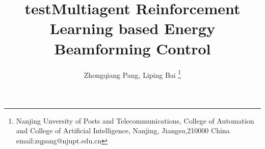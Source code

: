 %
%






\documentclass[journal]{IEEEtran}



\usepackage{amsmath,amssymb,amsfonts}
\usepackage{tabularx}
\usepackage[utf8]{inputenc} %
\usepackage[T1]{fontenc}    %
\usepackage{url}            %
\usepackage{booktabs}       %
\usepackage{amsfonts}       %
\usepackage{nicefrac}       %
\usepackage{microtype}      %
\usepackage{graphicx}
\usepackage{float}
\usepackage{multicol}
\usepackage{caption}
\usepackage{subcaption}
\usepackage{amsmath}
\usepackage{algorithm}
\usepackage{algpseudocode}
\usepackage{tikz}
\usetikzlibrary{trees}
\usepackage{listings}

\DeclareMathOperator*{\argmax}{arg\,max}  %
\DeclareMathOperator*{\argmin}{arg\,min}  %

\usepackage{textcomp}


\usepackage{xcolor,soul,framed} %

\usepackage[noadjust]{cite}
%




    \title{test}
\title{Multiagent Reinforcement Learning based Energy Beamforming Control}
\author{Zhongqiang Pang, Liping Bai \thanks{Nanjing Unversity of Posts and Telecommunications, College of Automation and College of Artificial Intelligence, Nanjing, Jiangsu,210000 China email:zqpang@njupt.edu.cn}}


